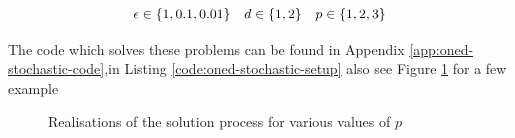 \begin{equation*}
  \begin{array}{c c c}
    \epsilon \in \{1, 0.1, 0.01\} &
    d \in \{1, 2\} &
    p \in \{1, 2, 3\}
  \end{array}
\end{equation*}

The code which solves these problems can be found in Appendix
\ref{app:oned-stochastic-code},in Listing \ref{code:oned-stochastic-setup} also
see Figure \ref{fig:oned-stochastic-realisations} for a few example

\begin{figure}
    \centering
    \begin{subfigure}[b]{0.55\textwidth}
        \centering
    \end{subfigure}
    \begin{subfigure}[b]{0.55\textwidth}
        \centering
    \end{subfigure}
    \caption{Realisations of the solution process for various values of $p$}
    \label{fig:oned-stochastic-realisations}
\end{figure}

